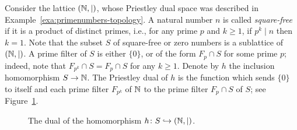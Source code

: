\begin{example}\label{exa:primenumbers-maps}
Consider the lattice $(\mathbb{N}, |)$, whose Priestley dual space was described in Example~\ref{exa:primenumbers-topology}. A natural number $n$ is called \emph{square-free} if it is a product of distinct primes, i.e., for any prime $p$ and $k \geq 1$, if $p^k \mid n$ then $k = 1$. Note that the subset $S$ of square-free or zero numbers is a sublattice of $(\mathbb{N}, |)$. A prime filter of $S$ is either $\{0\}$, or of the form $F_p \cap S$ for some prime $p$; indeed, note that $F_{p^k} \cap S = F_p \cap S$ for any $k \geq 1$. Denote by $h$ the inclusion homomorphism $S \to \mathbb{N}$. The Priestley dual of $h$ is the function which sends $\{0\}$ to itself and each prime filter $F_{p^k}$ of $\mathbb{N}$ to the prime filter $F_p \cap S$ of $S$; see Figure~\ref{fig:primenumbers-maps}.
\begin{figure}[htp]
  \begin{center}
  \end{center}
  \caption{The dual of the homomorphism $h \colon S \hookrightarrow (\mathbb{N}, |)$.}
  \label{fig:primenumbers-maps}
  \end{figure}


\end{example}
